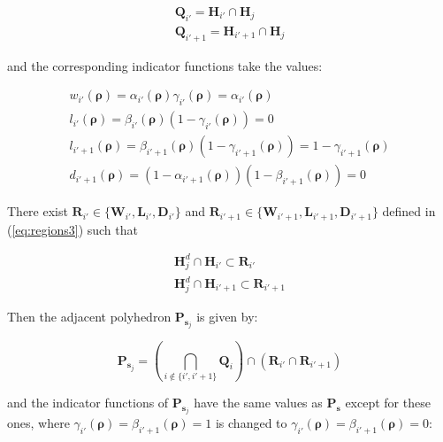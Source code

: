 \begin{equation}
\begin{array}{l}
\textbf{Q}_{i'}=\textbf{H}_{i'}\cap\textbf{H}_{j}\\
\textbf{Q}_{i'+1}=\textbf{H}_{i'+1}\cap\textbf{H}_{j}
\end{array}
\label{eq:modeSearch4}
\end{equation}

\noindent and the corresponding indicator functions take the values:

\begin{equation}
\begin{array}{l}
w_{i'}(\boldsymbol\rho)=\alpha_{i'}(\boldsymbol\rho)\gamma_{i'}(\boldsymbol\rho)=\alpha_{i'}(\boldsymbol\rho)\\
l_{i'}(\boldsymbol\rho)=\beta_{i'}(\boldsymbol\rho)(1-\gamma_{i'}(\boldsymbol\rho))=0\\
l_{i'+1}(\boldsymbol\rho)=\beta_{i'+1}(\boldsymbol\rho)(1-\gamma_{i'+1}(\boldsymbol\rho))=1-\gamma_{i'+1}(\boldsymbol\rho)\\
d_{i'+1}(\boldsymbol\rho)=(1-\alpha_{i'+1}(\boldsymbol\rho))(1-\beta_{i'+1}(\boldsymbol\rho))=0
\end{array}
\label{eq:modeSearch5}
\end{equation}

\noindent There exist $\textbf{R}_{i'} \in \{\textbf{W}_{i'}, \textbf{L}_{i'}, \textbf{D}_{i'}\}$ and $\textbf{R}_{i'+1} \in \{\textbf{W}_{i'+1}, \textbf{L}_{i'+1}, \textbf{D}_{i'+1}\}$ defined in (\ref{eq:regions3}) such that

\begin{equation}
\begin{array}{l}
\textbf{H}^{d}_{j}\cap \textbf{H}_{i'}\subset \textbf{R}_{i'}\\
\textbf{H}^{d}_{j}\cap \textbf{H}_{i'+1}\subset \textbf{R}_{i'+1}
\end{array}
\label{eq:modeSearch6}
\end{equation}

\noindent Then the adjacent polyhedron $\textbf{P}_{\boldsymbol s_{j}}$ is given by:

\begin{equation}
\textbf{P}_{\boldsymbol s_{j}}=(\bigcap_{i\notin\{i', i'+1\}} \textbf{Q}_{i})\cap (\textbf{R}_{i'}\cap\textbf{R}_{i'+1})
\label{eq:modeSearch7}
\end{equation}

\noindent and the indicator functions of $\textbf{P}_{\boldsymbol s_{j}}$ have the same values as $\textbf{P}_{\boldsymbol s}$ except for these ones, where $\gamma_{i'}(\boldsymbol\rho)=\beta_{i'+1}(\boldsymbol\rho)=1$ is changed to $\gamma_{i'}(\boldsymbol\rho)=\beta_{i'+1}(\boldsymbol\rho)=0$:

